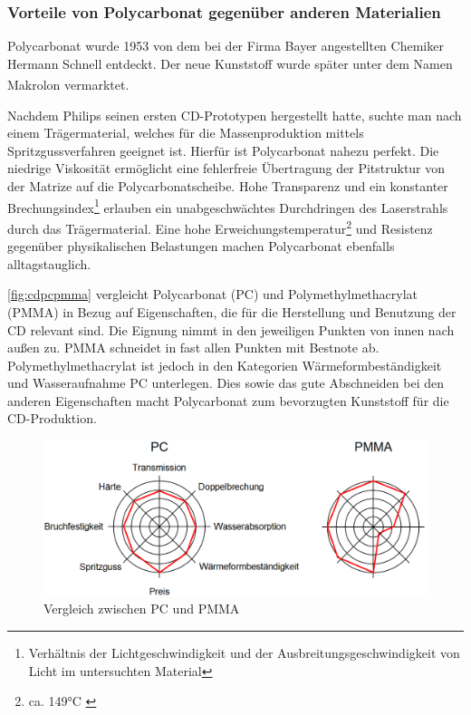 \subsubsection{Vorteile von Polycarbonat gegenüber anderen Materialien}

Polycarbonat wurde 1953 von dem bei der Firma Bayer angestellten Chemiker
Hermann Schnell entdeckt. Der neue Kunststoff wurde später unter dem Namen
Makrolon\textsuperscript{\textregistered} vermarktet. \cite{cuzpc}

Nachdem Philips seinen ersten CD-Prototypen hergestellt hatte, suchte man nach
einem Trägermaterial, welches für die Massenproduktion mittels
Spritzgussverfahren geeignet ist. Hierfür ist Polycarbonat nahezu perfekt. Die
niedrige Viskosität ermöglicht eine fehlerfreie Übertragung der Pitstruktur von
der Matrize auf die Polycarbonatscheibe. Hohe Transparenz und ein konstanter
Brechungsindex\footnote{Verhältnis der Lichtgeschwindigkeit und der
Ausbreitungsgeschwindigkeit von Licht im untersuchten Material} erlauben ein
unabgeschwächtes Durchdringen des Laserstrahls durch das Trägermaterial. Eine
hohe Erweichungstemperatur\footnote{ca. 149°C \cite{cuzpc2}} und Resistenz
gegenüber physikalischen Belastungen machen Polycarbonat ebenfalls
alltagstauglich. \cite{cfcd}

\autoref{fig:cdpcpmma} vergleicht Polycarbonat (PC) und Polymethylmethacrylat
(PMMA) in Bezug auf Eigenschaften, die für die Herstellung und Benutzung der CD
relevant sind. Die Eignung nimmt in den jeweiligen Punkten von innen nach außen
zu. PMMA schneidet in fast allen Punkten mit Bestnote ab. Polymethylmethacrylat
ist jedoch in den Kategorien Wärmeformbeständigkeit und Wasseraufnahme PC
unterlegen. Dies sowie das gute Abschneiden bei den anderen Eigenschaften macht
Polycarbonat zum bevorzugten Kunststoff für die CD-Produktion.

\begin{figure}[h]
    \begin{center}
        \begin{minipage}[t]{\textwidth}
            \begin{center}
                \includegraphics[height=0.1\textheight]{Bilder/Optische_Datentraeger_Die_Compact_Disc/Material_Polycarbonat/cdpcpmma.png}
                \caption[Vergleich zwischen PC und PMMA \newline Roth, Klaus: CD, DVD \& Co.: Die Chemie der schillernden Scheiben, in: Chemie in unserer Zeit (41/2007), S. 337]{Vergleich zwischen PC und PMMA}
                \label{fig:cdpcpmma}
            \end{center}
        \end{minipage}
    \end{center}
\end{figure}
